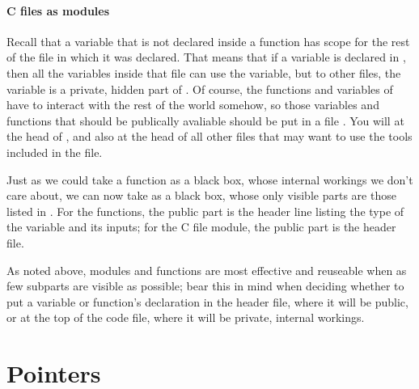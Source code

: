 \documentclass[12pt]{article}
\begin{document}
\paragraph{C files as modules}
Recall that a variable that is not declared inside a function has scope
for the rest of the file in which it was declared. That means that if a
variable is declared in , then all the variables inside
that file can use the variable, but to other  files, the
variable is a private, hidden part of . Of course, the
functions and variables of  have to interact with the
rest of the world somehow, so those variables and functions that should
be publically avaliable should be put in a file . You
will  at the head of ,
and also at the head of all other files that may want to use the tools
included in the  file.

Just as we could take a function as a black box, whose internal workings
we don't care about, we can now take  as a black box,
whose only visible parts are those listed in . For the functions, the public part is the
header line listing the type of the variable and its inputs; for the C file module, the public part is
the header file. 

As noted above, modules and functions are most effective and  reuseable when as few
subparts are visible as possible; bear this in mind when deciding whether to put a variable or
function's declaration in the header file, where it will be public, or at the top of the code file,
where it will be private, internal workings.

 \label{prepointers}\section{Pointers} \label{pointers} 
\end{document}
